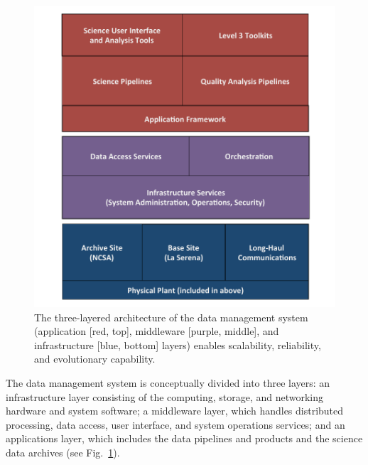 \documentclass{emulateapj}
\begin{document}
\begin{figure}
%
%
\hskip -0.2in
\includegraphics[width=1.1\hsize,clip]{DMsandwich.pdf}
\caption{The three-layered architecture of the data management system 
(application [red, top], middleware [purple, middle], and infrastructure [blue, bottom] layers) enables scalability, reliability, and evolutionary capability.} 
\label{Fig:DM1}
\end{figure}

The data management system is conceptually divided into three layers: an
infrastructure layer consisting of the computing, storage, and
networking hardware and system software; a middleware layer, which
handles distributed processing, data access, user interface, and
system operations services; and an applications layer, which includes
the data pipelines and products and the science data archives (see
Fig.~\ref{Fig:DM1}).
\end{document}
